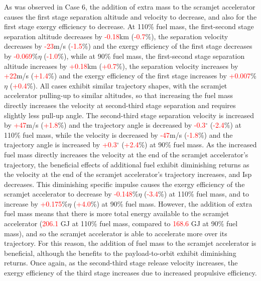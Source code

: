  As was observed in Case 6, the addition of extra mass to the scramjet accelerator causes the first stage separation altitude and velocity to decrease, and also for the first stage exergy efficiency to decrease. At 110\% fuel mass, the first-second stage separation altitude decreases by \textcolor{red}{-0.18}km (\textcolor{red}{-0.7}\%), the separation velocity decreases by \textcolor{red}{-23}m/s (\textcolor{red}{-1.5}\%) and the exergy efficiency of the first stage decreases by \textcolor{red}{-0.069}\%$\eta$ (\textcolor{red}{-1.0}\%), while at 90\% fuel mass, the first-second stage separation altitude increases by \textcolor{red}{+0.18}km (\textcolor{red}{+0.7}\%), the separation velocity increases by \textcolor{red}{+22}m/s (\textcolor{red}{+1.4}\%) and the exergy efficiency of the first stage increases by \textcolor{red}{+0.007}\%$\eta$ (\textcolor{red}{+0.4}\%).
All cases exhibit similar trajectory shapes, with the scramjet accelerator pulling-up to similar altitudes, so that increasing the fuel mass directly increases the velocity at second-third stage separation and requires slightly less pull-up angle. The second-third stage separation velocity is increased by \textcolor{red}{+47}m/s (\textcolor{red}{+1.8}\%) and the trajectory angle is decreased by \textcolor{red}{-0.3}$^\circ$ (\textcolor{red}{-2.4}\%) at 110\% fuel mass, while the velocity is decreased by \textcolor{red}{-47}m/s (\textcolor{red}{-1.8}\%) and the trajectory angle is increased by \textcolor{red}{+0.3}$^\circ$ (\textcolor{red}{+2.4}\%) at 90\% fuel mass. 
As the increased fuel mass directly increases the velocity at the end of the scramjet accelerator's trajectory, the beneficial effects of additional fuel exhibit diminishing returns as the velocity at the end of the scramjet accelerator's trajectory increases, and Isp decreases.
This diminishing specific impulse causes the exergy efficiency of the scramjet accelerator to decrease by \textcolor{red}{-0.148}\%$\eta$ (\textcolor{red}{-3.4}\%) at 110\% fuel mass, and to increase by \textcolor{red}{+0.175}\%$\eta$ (\textcolor{red}{+4.0}\%) at 90\% fuel mass. 
However, the addition of extra fuel mass means that there is more total energy available to the scramjet accelerator (\textcolor{red}{206.1} GJ at 110\% fuel mass, compared to \textcolor{red}{168.6} GJ at 90\% fuel mass), and so the scramjet accelerator is able to accelerate more over its trajectory. For this reason, the addition of fuel mass to the scramjet accelerator is beneficial, although the benefits to the payload-to-orbit exhibit diminishing returns. 
Once again, as the second-third stage release velocity increases, the exergy efficiency of the third stage increases due to increased propulsive efficiency. 


